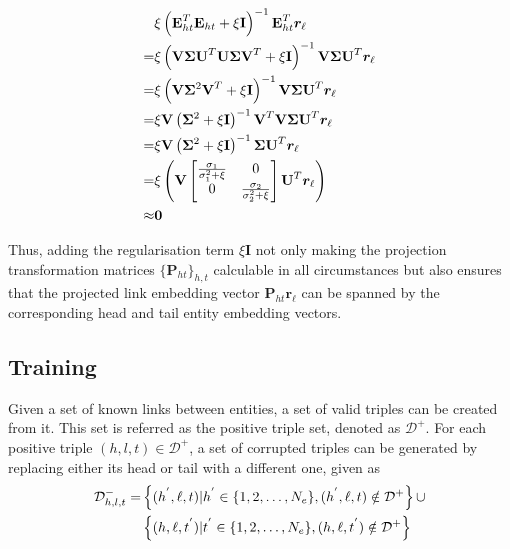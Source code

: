 \documentclass[9pt]{sig-alternate-05-2015}
\begin{document}
\begin{align}
& \xi \left(\textbf{E}_{ht}^{T} \textbf{E}_{ht} + \xi \textbf{I}\right )^{-1} \textbf{E}_{ht}^{T} \bm{r}_{\ell} \notag \\
=& \xi \left(\textbf{V} \mathbf{\Sigma} \textbf{U}^{T}  \textbf{U} \mathbf{\Sigma} \textbf{V}^{T} + \xi \textbf{I}\right )^{-1} \textbf{V} \mathbf{\Sigma} \textbf{U}^{T} \bm{r}_{\ell} \notag \\
=& \xi \left(\textbf{V} \mathbf{\Sigma}^2 \textbf{V}^{T} + \xi \textbf{I}\right )^{-1} \textbf{V} \mathbf{\Sigma} \textbf{U}^{T} \bm{r}_{\ell} \notag \\
=& \xi \textbf{V} \left(\mathbf{\Sigma}^2 + \xi \textbf{I} \right)^{-1} \textbf{V}^{T} \textbf{V} \mathbf{\Sigma} \textbf{U}^{T} \bm{r}_{\ell} \notag \\
=& \xi \textbf{V} \left(\mathbf{\Sigma}^2 + \xi \textbf{I} \right)^{-1} \mathbf{\Sigma} \textbf{U}^{T} \bm{r}_{\ell} \notag \\
=& \xi \left( \textbf{V} \begin{bmatrix} \frac{\sigma_1}{\sigma_1^2 + \xi} & 0 \\ 0 & \frac{\sigma_2}{\sigma_2^2 + \xi}   \end{bmatrix} \textbf{U}^{T} \bm{r}_{\ell}  \right)\notag \\
\approx & \bm{0}
\end{align}

Thus, adding the regularisation term $\xi \textbf{I}$ not only making the projection transformation matrices $\{\textbf{P}_{ht}\}_{h,t}$ calculable in all circumstances but also ensures that the projected link embedding vector $\textbf{P}_{ht} \bm{r}_{\ell}$ can be spanned by the corresponding head and tail entity embedding vectors.

\subsection{Training}
Given a set of known links between entities, a set of valid triples can be created from it. This set is referred as the positive triple  set, denoted as $\mathcal{D}^+$. For each positive triple $(h,l,t)\in\mathcal{D}^+$, a set of  corrupted triples can be generated by replacing either its head or tail  with a different one, given as
\begin{align*}
\small
\mathcal{D}^{-}_{h,l,t} = &  \left\{ (h^{'},\ell,t)  |  h^{'} \in \{ 1,2,\ldots, N_e\}, (h^{'},\ell,t)\notin \mathcal{D}^+ \right\} \cup \\
 &  \left\{ (h,\ell,t^{'})  |   t^{'} \in \{ 1,2,\ldots, N_e\},  (h,\ell,t^{'}) \notin \mathcal{D}^+\right\}
\end{align*}
\end{document}

